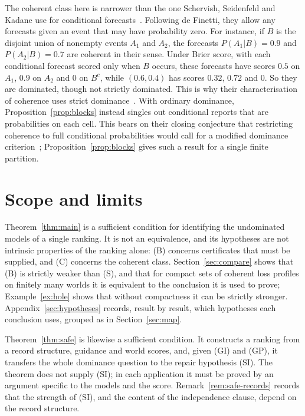 \documentclass[11pt]{article}
\theoremstyle{definition}
\theoremstyle{remark}
\begin{document}
The coherent class here is narrower than the one Schervish, Seidenfeld and Kadane use for conditional forecasts~\cite{SSK09}. Following de Finetti, they allow any forecasts given an event that may have probability zero. For instance, if $B$ is the disjoint union of nonempty events $A_1$ and $A_2$, the forecasts $P(A_1|B)=0.9$ and $P(A_2|B)=0.7$ are coherent in their sense. Under Brier score, with each conditional forecast scored only when $B$ occurs, these forecasts have scores $0.5$ on $A_1$, $0.9$ on $A_2$ and $0$ on $B^c$, while $(0.6,0.4)$ has scores $0.32$, $0.72$ and $0$. So they are dominated, though not strictly dominated. This is why their characterisation of coherence uses strict dominance~\cite[Theorem~1]{SSK09}. With ordinary dominance, Proposition~\ref{prop:blocks} instead singles out conditional reports that are probabilities on each cell. This bears on their closing conjecture that restricting coherence to full conditional probabilities would call for a modified dominance criterion~\cite[Section~6]{SSK09}; Proposition~\ref{prop:blocks} gives such a result for a single finite partition.


\section{Scope and limits}\label{sec:scope}
Theorem~\ref{thm:main} is a sufficient condition for identifying the undominated models of a single ranking. It is not an equivalence, and its hypotheses are not intrinsic properties of the ranking alone: (B) concerns certificates that must be supplied, and (C) concerns the coherent class. Section~\ref{sec:compare} shows that (B) is strictly weaker than (S), and that for compact sets of coherent loss profiles on finitely many worlds it is equivalent to the conclusion it is used to prove; Example~\ref{ex:hole} shows that without compactness it can be strictly stronger. Appendix~\ref{sec:hypotheses} records, result by result, which hypotheses each conclusion uses, grouped as in Section~\ref{sec:map}.

Theorem~\ref{thm:safe} is likewise a sufficient condition. It constructs a ranking from a record structure, guidance and world scores, and, given (GI) and (GP), it transfers the whole dominance question to the repair hypothesis (SI). The theorem does not supply (SI); in each application it must be proved by an argument specific to the models and the score. Remark~\ref{rem:safe-records} records that the strength of (SI), and the content of the independence clause, depend on the record structure.
\end{document}
